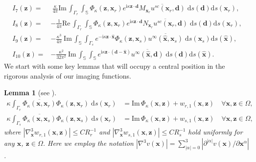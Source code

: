\documentclass[10pt,a4paper]{article}
\numberwithin{equation}{section}
\newtheorem{lemma}[theorem]{Lemma}
\begin{document}
\begin{align}
   \label{fun-7}
   I_7(\bm{ z }) =&  ~ \frac{\kappa}{4\pi} \mathrm{Im}\, \int_{ \Gamma_{r} } \int_{\mathbb{S}  } \Phi_{\kappa}(\bm{ z },\bm{ x }_r) e^{\mathrm{ i } \kappa \bm{ z }\cdot \bm{ d }}
                    \overline{M_{\bm{ x }_{r} }u^{sc}(\bm{ x }_r,\bm{ d })} \;\mathrm{d}s(\bm{ d })\mathrm{d}s(\bm{ x }_r), \\
   \label{fun-8}
   I_8(\bm{ z }) =&  -\frac{1}{4\pi}\mathrm{Re}\, \int_{ \Gamma_{r} } \int_{\mathbb{S}  } \Phi_{\kappa}(\bm{ z },\bm{ x }_r) e^{\mathrm{ i } \kappa \bm{ z }\cdot \bm{ d }}
                    \overline{N_{\bm{ x }_{r} } u^{sc}(\bm{ x }_r,\bm{ d })}
                    \;\mathrm{d}s(\bm{ d })\mathrm{d}s(\bm{ x }_r), \\
   \label{fun-9}
  I_9(\bm{ z }) =& -\frac{ \kappa^3}{4\pi} ~\mathrm{Im}\,\int_{\mathbb{S}  } \int_{ \Gamma_s }  e^{-\mathrm{ i } \kappa \bm{ z }\cdot \bm{\hat{ x} }} \Phi_{\kappa}(\bm{ z },\bm{ x }_s)
                   \overline{u^{\infty}(\bm{\hat{ x} },\bm{ x }_s)} \;\mathrm{d}s(\bm{ x }_s)\mathrm{d}s(\bm{\hat{ x} }), \\
   \label{fun-10}
  I_{10}(\bm{ z }) =& -\frac{ \kappa^2}{32\pi^2} ~ \mathrm{Im}\, \int_{ \mathbb{S}  } \int_{\mathbb{S}  } e^{\mathrm{ i } \kappa \bm{ z }\cdot (\bm{ d }-\hat{\bm x})}
                   \overline{u^{\infty}(\bm{\hat{ x} },\bm{ d })} \;\mathrm{d}s(\bm{ d })\mathrm{d}s(\bm{\hat{ x} }).
\end{align}
 We start with some key lemmas that will occupy a central position  in the rigorous analysis of our imaging functions.
 \begin{lemma}[see \cite{chen_reverse_2013}]
   \label{lem:asymptotic}
   \begin{align}
     \label{eq:asy-1}
     \kappa \int_{ \Gamma_{r} }\overline{ \Phi_{\kappa}(\bm{ x },\bm{ x }_r)}\Phi_{\kappa}(\bm{ z },\bm{ x }_r) \;\mathrm{d}s(\bm{ x }_r)
     & =  \mathrm{Im}\, \Phi_{\kappa} (\bm{ x }, \bm{ z }) + w_{r,1} (\bm{ x }, \bm{ z }) \quad \forall  \bm{ x }, \bm{ z } \in  \Omega,\\
     \label{eq:asy-2}
     \kappa \int_{ \Gamma_{s} }\overline{ \Phi_{\kappa}(\bm{ x },\bm{ x }_s)}\Phi_{\kappa}(\bm{ z },\bm{ x }_s) \;\mathrm{d}s(\bm{ x }_r)
     & =  \mathrm{Im}\, \Phi_{\kappa} (\bm{ x }, \bm{ z }) + w_{s,1} (\bm{ x }, \bm{ z }) \quad \forall  \bm{ x }, \bm{ z } \in  \Omega,     
   \end{align}
   where $|\nabla_{\bm{ x }}^3w_{r,1}( \bm{ x }, \bm{ z })|\leq C R_{r}^{-1}$ and $|\nabla_{\bm{ x }}^3 w_{s,1}( \bm{ x }, \bm{ z })|\leq C R_{s}^{-1}$ hold uniformly for any $\bm{ x }$, $\bm{ z }\in \Omega$. Here we employ the notation $|\nabla^3v(\bm{ x })|=\sum_{|\alpha|=0}^3 | \partial^{|\alpha|}v(\bm{ x })/\partial \bm{ x }^{\alpha} | $.
 \end{lemma}
\end{document}
